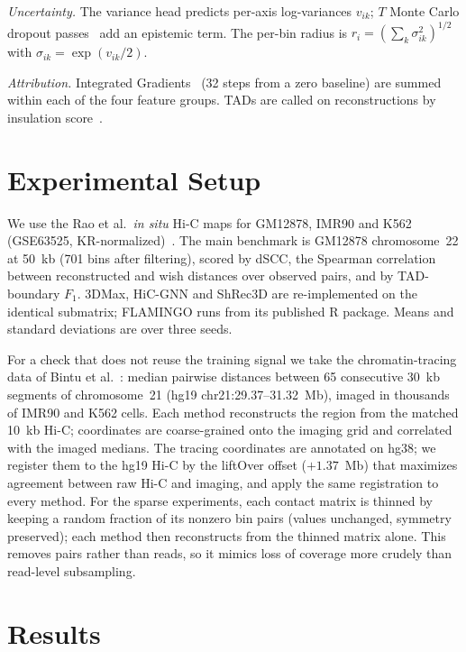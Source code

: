 \documentclass[conference]{IEEEtran}
\begin{document}
\textit{Uncertainty.} The variance head predicts per-axis log-variances
$v_{ik}$; $T$ Monte Carlo dropout passes~\cite{gal2016} add an epistemic
term. The per-bin radius is
$r_i=(\sum_k\sigma_{ik}^2)^{1/2}$ with $\sigma_{ik}=\exp(v_{ik}/2)$.

\textit{Attribution.} Integrated Gradients~\cite{sundararajan2017} (32
steps from a zero baseline) are summed within each of the four feature
groups. TADs are called on reconstructions by insulation
score~\cite{crane2015}.

\section{Experimental Setup}

We use the Rao et al.\ \textit{in situ} Hi-C maps for GM12878, IMR90 and
K562 (GSE63525, KR-normalized)~\cite{rao2014}. The main benchmark is
GM12878 chromosome~22 at 50~kb (701 bins after filtering), scored by
dSCC, the Spearman correlation between reconstructed and wish distances
over observed pairs, and by TAD-boundary $F_1$. 3DMax, HiC-GNN and
ShRec3D are re-implemented on the identical submatrix; FLAMINGO runs from
its published R package. Means and standard deviations are over three
seeds.

For a check that does not reuse the training signal we take the
chromatin-tracing data of Bintu et al.~\cite{bintu2018}: median pairwise
distances between 65 consecutive 30~kb segments of chromosome~21 (hg19
chr21:29.37--31.32~Mb), imaged in thousands of IMR90 and K562 cells. Each
method reconstructs the region from the matched 10~kb Hi-C; coordinates
are coarse-grained onto the imaging grid and correlated with the imaged
medians. The tracing coordinates are annotated on hg38; we register them
to the hg19 Hi-C by the liftOver offset ($+1.37$~Mb) that maximizes
agreement between raw Hi-C and imaging, and apply the same registration
to every method. For the sparse experiments, each contact matrix is
thinned by keeping a random fraction of its nonzero bin pairs (values
unchanged, symmetry preserved); each method then reconstructs from the
thinned matrix alone. This removes pairs rather than reads, so it
mimics loss of coverage more crudely than read-level subsampling.

\section{Results}
\end{document}
